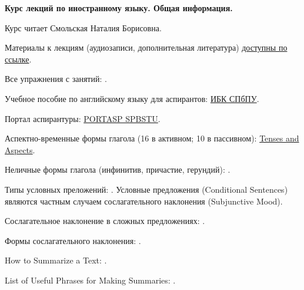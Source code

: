\documentclass[main.tex]{subfiles}
\begin{document}
{\parindent0pt

\textbf{Курс лекций по иностранному языку. Общая информация.}

\vspace{5pt}

Курс читает Смольская Наталия Борисовна.

Материалы к лекциям (аудиозаписи, дополнительная литература) \href{https://drive.google.com/drive/folders/1iSx2EjJJ98rhPpOsM4xGcJA7-7qitQHM?usp=sharing}{доступны по ссылке}.

Все упражнения с занятий: \hyperref[sec:all-tasks-lk]{\color{blue}{УПРАЖНЕНИЯ}}.

Учебное пособие по английскому языку для аспирантов: \href{https://elib.spbstu.ru/dl/2/s19-119.pdf/info}{ИБК СПбПУ}.

Портал аспирантуры: \href{https://portasp.spbstu.ru/login/index.php}{PORTASP SPBSTU}.

\vspace{5pt}

Аспектно-временные формы глагола (16 в активном; 10 в пассивном): \href{https://mualal.github.io/asp/english/EnglishTensesAspectsVoicesPoster.pdf}{Tenses and Aspects}.

\vspace{5pt}

Неличные формы глагола (инфинитив, причастие, герундий): \hyperref[subsec:impersonal-lk]{\color{blue}{IMPERSONAL FORMS}}.

\vspace{5pt}

Типы условных преложений: \hyperref[subsec:conditionals-types]{\color{blue}{CONDITIONALS}}. Условные предложения (Conditional Sentences) являются частным случаем сослагательного наклонения (Subjunctive Mood).

Сослагательное наклонение в сложных предложениях: \hyperref[subsec:subjunctive-mood-lk]{\color{blue}{SUBJUNCTIVE MOOD}}.

Формы сослагательного наклонения: \hyperlink{subjunctive-mood-forms-table}{\color{blue}{Subjunctive Mood Forms}}.

\vspace{5pt}

How to Summarize a Text: \hyperref[subsec:tips-on-summarizing]{\color{blue}{TIPS ON SUMMARIZING}}.

List of Useful Phrases for Making Summaries: \hyperref[subsec:list-of-useful-phrases-for-making-summaries]{\color{blue}{LIST OF PHRASES}}.

}
\end{document}
